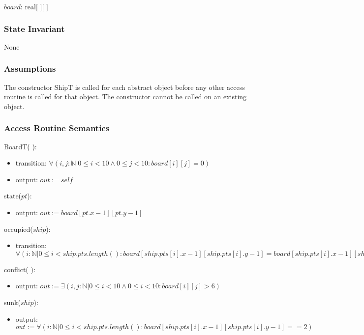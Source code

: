 \documentclass[12pt]{article}
\begin{document}
$\mathit{board}$: real[ ][ ] \\

\subsubsection* {State Invariant}
None

\subsubsection* {Assumptions}
The constructor ShipT is called for each abstract object before any other access routine is called for that
object.  The constructor cannot be called on an existing object.

\subsubsection* {Access Routine Semantics}

\noindent BoardT( ):
\begin{itemize}
\item transition: $\forall (i,j : \mathbb{N} | 0 \leq i < 10 \wedge 0 \leq j < 10 :
board[i][j] = 0 )$
\item output: $out := \mathit{self}$
\end{itemize}

\noindent state($pt$):
\begin{itemize}
\item output: $out := board[pt.x-1][pt.y-1]$
\end{itemize}

\noindent occupied($ship$):
\begin{itemize}
\item transition: $\forall (i:\mathbb{N}|0 \leq i < ship.pts.length() : 
board[ship.pts[i].x -1][ship.pts[i].y -1] =board[ship.pts[i].x -1][ship.pts[i].y -1]+ 6)$
\end{itemize}

\noindent conflict( ):
\begin{itemize}
\item output: $out:= \exists (i,j:\mathbb{N}|0 \leq i < 10 \wedge 0 \leq i < 10 : 
board[i][j] > 6)$
\end{itemize}

\noindent sunk($ship$):
\begin{itemize}
\item output: $out:= \forall (i:\mathbb{N}|0 \leq i < ship.pts.length() : 
board[ship.pts[i].x -1][ship.pts[i].y -1] == 2)$
\end{itemize}
\end{document}
